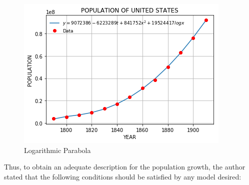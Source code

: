 \documentclass[a4paper]{article}
\begin{document}
\begin{figure}[h]
  \includegraphics[width=\linewidth]{logarithmic}
  \caption{Logarithmic Parabola}
  \label{fig:1}
\end{figure}


Thus, to obtain an adequate description for the population growth,  the author stated that the following conditions should be satisfied by any model desired:\
\end{document}
